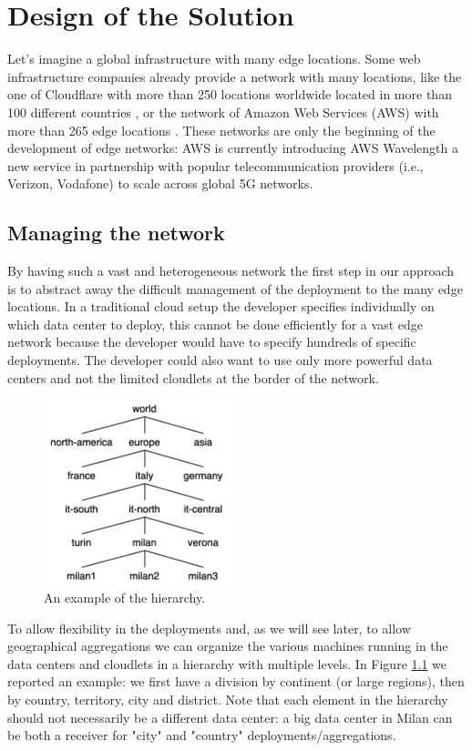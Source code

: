 \chapter{Design of the Solution}
\label{ch:design}

Let’s imagine a global infrastructure with many edge locations. Some web infrastructure companies already provide a network with many locations, like the one of Cloudflare with more than 250 locations worldwide located in more than 100 different countries \cite{cloudflare-network}, or the network of Amazon Web Services (AWS) with more than 265 edge locations \cite{aws-network}.
These networks are only the beginning of the development of edge networks: AWS is currently introducing AWS Wavelength \cite{aws-wavelength} a new service in partnership with popular telecommunication providers (i.e., Verizon, Vodafone) to scale across global 5G networks.


\section{Managing the network}
By having such a vast and heterogeneous network the first step in our approach is to abstract away the difficult management of the deployment to the many edge locations.
In a traditional cloud setup the developer specifies individually on which data center to deploy, this cannot be done efficiently for a vast edge network because the developer would have to specify hundreds of specific deployments.
The developer could also want to use only more powerful data centers and not the limited cloudlets at the border of the network.

\begin{figure} %
\caption{An example of the hierarchy.}
\label{fig:hierarchy}
\includegraphics[width=5.5cm]{Figures/Solution/hierarchy.png}
\end{figure} 

To allow flexibility in the deployments and, as we will see later, to allow geographical aggregations we can organize the various machines running in the data centers and cloudlets in a hierarchy with multiple levels.
In Figure \ref{fig:hierarchy} we reported an example: we first have a division by continent (or large regions), then by country, territory, city and district.
Note that each element in the hierarchy should not necessarily be a different data center: a big data center in Milan can be both a receiver for "city" and "country" deployments/aggregations.
\vspace{0.5cm}


